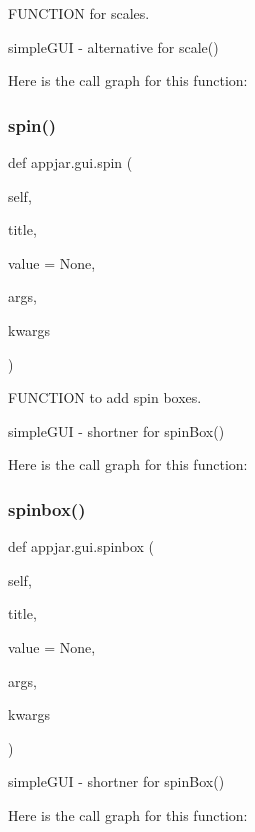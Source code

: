 \begin{DoxyVerb}
F\+U\+N\+C\+T\+I\+ON for scales. 

\begin{DoxyVerb}simpleGUI - alternative for scale() \end{DoxyVerb}
 Here is the call graph for this function\+:
\mbox{\label{classappjar_1_1gui_a2e3a74c36436276af7a6360a5a290374}} 
\subsubsection{\texorpdfstring{spin()}{spin()}}
{\footnotesize\ttfamily def appjar.\+gui.\+spin (\begin{DoxyParamCaption}\item[{}]{self,  }\item[{}]{title,  }\item[{}]{value = {\ttfamily None},  }\item[{}]{args,  }\item[{}]{kwargs }\end{DoxyParamCaption})}



F\+U\+N\+C\+T\+I\+ON to add spin boxes. 

\begin{DoxyVerb}simpleGUI - shortner for spinBox() \end{DoxyVerb}
 Here is the call graph for this function\+:
\mbox{\label{classappjar_1_1gui_abd6237ace9166a9cd526087aaa16c8a4}} 
\subsubsection{\texorpdfstring{spinbox()}{spinbox()}}
{\footnotesize\ttfamily def appjar.\+gui.\+spinbox (\begin{DoxyParamCaption}\item[{}]{self,  }\item[{}]{title,  }\item[{}]{value = {\ttfamily None},  }\item[{}]{args,  }\item[{}]{kwargs }\end{DoxyParamCaption})}

\begin{DoxyVerb}simpleGUI - shortner for spinBox() \end{DoxyVerb}
 Here is the call graph for this function\+:
\mbox{\label{classappjar_1_1gui_a0f0bbd7063c1509a99084ff40f323d83}} 

\end{DoxyVerb}
